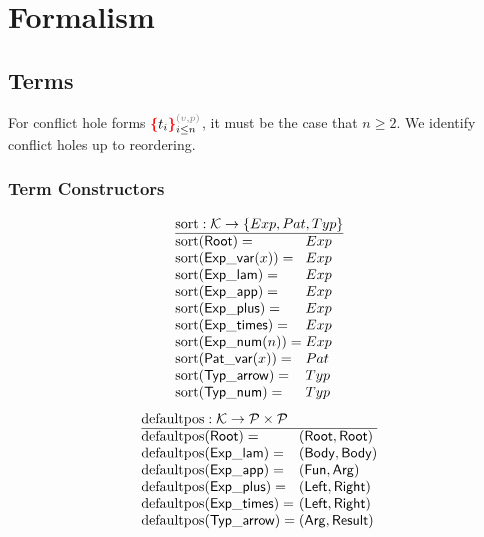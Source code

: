 \section{Formalism}


\subsection{Terms}

\figureTermSyntaxContent

For conflict hole forms $\conflictHole[i \leq n]{t_i}{v}{p}$,
it must be the case that $n \geq 2$.
We identify conflict holes up to reordering.


\subsubsection{Term Constructors}

\[
  \arraycolsep=0pt
  \begin{array}{ll}
    \multicolumn{2}{l}{\sortOp : \K \to \SetOf{Exp, Pat, Typ}} \\
    \hline
    \sort{\Root}={} & Exp \\
    \sort{\ExpVar(x)}={} & Exp \\
    \sort{\ExpLam}={} & Exp \\
    \sort{\ExpApp}={} & Exp \\
    \sort{\ExpPlus}={} & Exp \\
    \sort{\ExpTimes}={} & Exp \\
    \sort{\ExpNum(n)}={} & Exp \\
    \sort{\PatVar(x)}={} & Pat \\
    \sort{\TypArrow}={} & Typ \\
    \sort{\TypNum}={} & Typ \\
  \end{array}
\]
%
\figureArityContent
%
\[
  \arraycolsep=0pt
  \begin{array}{ll}
    \multicolumn{2}{l}{\defaultposOp : \K \to \P \times \P} \\
    \hline
    \defaultpos{\Root}={} & (\Root, \Root) \\
    \defaultpos{\ExpLam}={} & (\LamBody, \LamBody) \\
    \defaultpos{\ExpApp}={} & (\AppFun, \AppArg) \\
    \defaultpos{\ExpPlus}={} & (\PlusLeft, \PlusRight) \\
    \defaultpos{\ExpTimes}={} & (\TimesLeft, \TimesRight) \\
    \defaultpos{\TypArrow}={} & (\ArrowArg, \ArrowResult) \\
  \end{array}
\]
%

